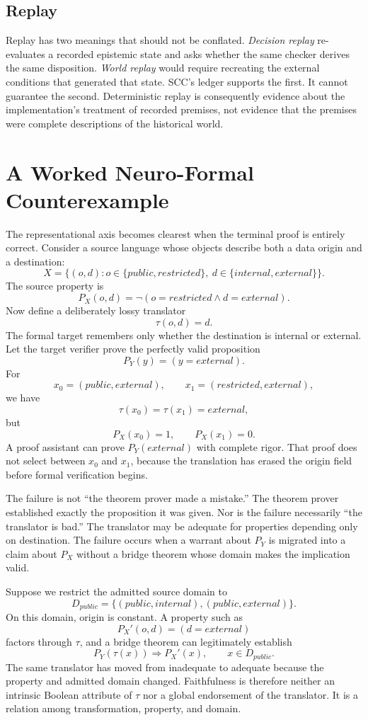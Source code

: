 \documentclass[11pt]{article}
\begin{document}
\subsection{Replay}
Replay has two meanings that should not be conflated. \emph{Decision replay} re-evaluates a recorded epistemic state and asks whether the same checker derives the same disposition. \emph{World replay} would require recreating the external conditions that generated that state. SCC's ledger supports the first. It cannot guarantee the second. Deterministic replay is consequently evidence about the implementation's treatment of recorded premises, not evidence that the premises were complete descriptions of the historical world.

\section{A Worked Neuro-Formal Counterexample}
The representational axis becomes clearest when the terminal proof is entirely correct. Consider a source language whose objects describe both a data origin and a destination:
\[
X=\{(o,d):o\in\{public,restricted\},\ d\in\{internal,external\}\}.
\]
The source property is
\[
P_X(o,d)=\neg(o=restricted\land d=external).
\]
Now define a deliberately lossy translator
\[
\tau(o,d)=d.
\]
The formal target remembers only whether the destination is internal or external. Let the target verifier prove the perfectly valid proposition
\[
P_Y(y)=(y=external).
\]
For
\[
x_0=(public,external),\qquad x_1=(restricted,external),
\]
we have
\[
\tau(x_0)=\tau(x_1)=external,
\]
but
\[
P_X(x_0)=1,\qquad P_X(x_1)=0.
\]
A proof assistant can prove $P_Y(external)$ with complete rigor. That proof does not select between $x_0$ and $x_1$, because the translation has erased the origin field before formal verification begins.

The failure is not ``the theorem prover made a mistake.'' The theorem prover established exactly the proposition it was given. Nor is the failure necessarily ``the translator is bad.'' The translator may be adequate for properties depending only on destination. The failure occurs when a warrant about $P_Y$ is migrated into a claim about $P_X$ without a bridge theorem whose domain makes the implication valid.

Suppose we restrict the admitted source domain to
\[
D_{public}=\{(public,internal),(public,external)\}.
\]
On this domain, origin is constant. A property such as
\[
P_X'(o,d)=(d=external)
\]
factors through $\tau$, and a bridge theorem can legitimately establish
\[
P_Y(\tau(x))\Longrightarrow P_X'(x),\qquad x\in D_{public}.
\]
The same translator has moved from inadequate to adequate because the property and admitted domain changed. Faithfulness is therefore neither an intrinsic Boolean attribute of $\tau$ nor a global endorsement of the translator. It is a relation among transformation, property, and domain.
\end{document}
